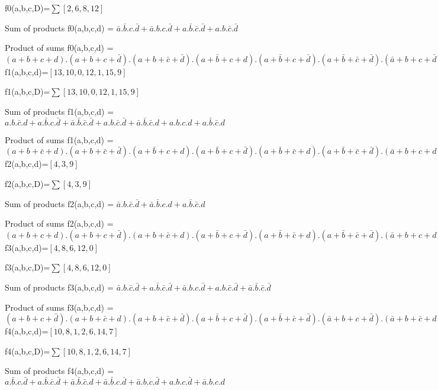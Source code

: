 f0(a,b,c,D)=$ \sum [2, 6, 8, 12] $ 


Sum of products 
 f0(a,b,c,d) = $\bar a.\bar b.c.\bar d + \bar a.b.c.\bar d + a.\bar b.\bar c.\bar d + a.b.\bar c.\bar d$

Product of sums 
 f0(a,b,c,d) = $(a+b+c+d) . (a+b+c+\bar d) . (a+b+\bar c+\bar d) . (a+\bar b+c+d) . (a+\bar b+c+\bar d) . (a+\bar b+\bar c+\bar d) . (\bar a+b+c+\bar d) . (\bar a+b+\bar c+d) . (\bar a+b+\bar c+\bar d) . (\bar a+\bar b+c+\bar d) . (\bar a+\bar b+\bar c+d) . (\bar a+\bar b+\bar c+\bar d)$
f1(a,b,c,d)=$[13, 10, 0, 12, 1, 15, 9]$

f1(a,b,c,D)=$ \sum [13, 10, 0, 12, 1, 15, 9] $ 


Sum of products 
 f1(a,b,c,d) = $a.b.\bar c.d + a.\bar b.c.\bar d + \bar a.\bar b.\bar c.\bar d + a.b.\bar c.\bar d + \bar a.\bar b.\bar c.d + a.b.c.d + a.\bar b.\bar c.d$

Product of sums 
 f1(a,b,c,d) = $(a+b+\bar c+d) . (a+b+\bar c+\bar d) . (a+\bar b+c+d) . (a+\bar b+c+\bar d) . (a+\bar b+\bar c+d) . (a+\bar b+\bar c+\bar d) . (\bar a+b+c+d) . (\bar a+b+\bar c+\bar d) . (\bar a+\bar b+\bar c+d)$
f2(a,b,c,d)=$[4, 3, 9]$

f2(a,b,c,D)=$ \sum [4, 3, 9] $ 


Sum of products 
 f2(a,b,c,d) = $\bar a.b.\bar c.\bar d + \bar a.\bar b.c.d + a.\bar b.\bar c.d$

Product of sums 
 f2(a,b,c,d) = $(a+b+c+d) . (a+b+c+\bar d) . (a+b+\bar c+d) . (a+\bar b+c+\bar d) . (a+\bar b+\bar c+d) . (a+\bar b+\bar c+\bar d) . (\bar a+b+c+d) . (\bar a+b+\bar c+d) . (\bar a+b+\bar c+\bar d) . (\bar a+\bar b+c+d) . (\bar a+\bar b+c+\bar d) . (\bar a+\bar b+\bar c+d) . (\bar a+\bar b+\bar c+\bar d)$
f3(a,b,c,d)=$[4, 8, 6, 12, 0]$

f3(a,b,c,D)=$ \sum [4, 8, 6, 12, 0] $ 


Sum of products 
 f3(a,b,c,d) = $\bar a.b.\bar c.\bar d + a.\bar b.\bar c.\bar d + \bar a.b.c.\bar d + a.b.\bar c.\bar d + \bar a.\bar b.\bar c.\bar d$

Product of sums 
 f3(a,b,c,d) = $(a+b+c+\bar d) . (a+b+\bar c+d) . (a+b+\bar c+\bar d) . (a+\bar b+c+\bar d) . (a+\bar b+\bar c+\bar d) . (\bar a+b+c+\bar d) . (\bar a+b+\bar c+d) . (\bar a+b+\bar c+\bar d) . (\bar a+\bar b+c+\bar d) . (\bar a+\bar b+\bar c+d) . (\bar a+\bar b+\bar c+\bar d)$
f4(a,b,c,d)=$[10, 8, 1, 2, 6, 14, 7]$

f4(a,b,c,D)=$ \sum [10, 8, 1, 2, 6, 14, 7] $ 


Sum of products 
 f4(a,b,c,d) = $a.\bar b.c.\bar d + a.\bar b.\bar c.\bar d + \bar a.\bar b.\bar c.d + \bar a.\bar b.c.\bar d + \bar a.b.c.\bar d + a.b.c.\bar d + \bar a.b.c.d$

